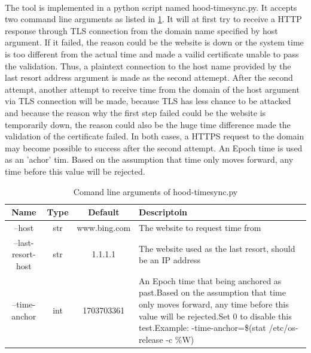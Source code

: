 \documentclass[mscthesis]{usiinfthesis}
\begin{document}
\paragraph{}
The tool is implemented in a python script named hood-timesync.py. It accepts two command line arguments as listed in \cref{tab:timesync_cmdarg}. It will at first try to receive a HTTP response through TLS connection from the domain name specified by host argument. If it failed, the reason could be the website is down or the system time is too different from the actual time and made a vailid certificate unable to pass the validation. Thus, a plaintext connection to the host name provided by the last resort address argument is made as the second attemept. After the second attempt, another attempt to receive time from the domain of the host argument via TLS connection will be made, because TLS has less chance to be attacked and because the reason why the first step failed could be the website is temporarily down, the reason could also be the huge time difference made the validation of the certificate failed. In both cases, a HTTPS request to the domain may become possible to success after the second attempt. An Epoch time is used as an 'achor' tim. Based on the assumption that time only moves forward, any time before this value will be rejected.

\begin{table}[H]
  \centering
  \begin{tabular}{|c|c|c|m{68mm}|}
    \hline
    Name               & Type & Default      & Descriptoin                                                                                                                                                                                                                                               \\
    \hline
    --host             & str  & www.bing.com & The website to request time from                                                                                                                                                                                                                          \\
    --last-resort-host & str  & 1.1.1.1      & The website used as the last resort, should be an IP address                                                                                                                                                                                              \\
    --time-anchor      & int  & 1703703361   & An Epoch time that being anchored as past.\newline Based on the assumption that time only moves forward, any time before this value will be rejected.\newline Set 0 to disable this test.\newline Example: -\-time-anchor=\$(stat /etc/os-release -c \%W) \\
    \hline
  \end{tabular}
  \caption{Comand line arguments of hood-timesync.py}
  \label{tab:timesync_cmdarg}
\end{table}
\end{document}
